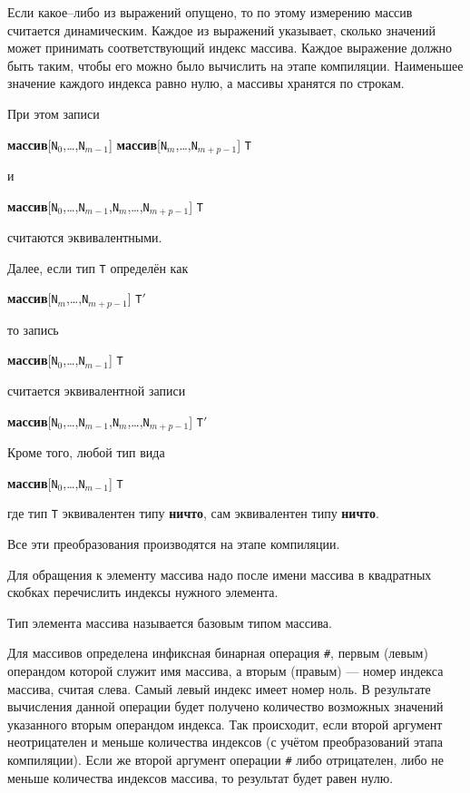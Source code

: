 \documentclass[10pt]{report}
\begin{document}
Если какое--либо из выражений опущено, то по этому измерению массив считается динамическим. Каждое из выражений указывает, сколько значений может принимать соответствующий
индекс массива. Каждое выражение должно быть таким, чтобы его можно было вычислить на этапе компиляции. Наименьшее значение каждого индекса равно нулю, а массивы хранятся по
строкам.

При этом записи
\begin{center}
\textbf{массив}[\texttt{N}$_0$,\dots,\texttt{N}$_{m-1}$] \textbf{массив}[\texttt{N}$_{m}$,\dots,\texttt{N}$_{m+p-1}$] \texttt{T}
\end{center}
и
\begin{center}
\textbf{массив}[\texttt{N}$_0$,\dots,\texttt{N}$_{m-1}$,\texttt{N}$_{m}$,\dots,\texttt{N}$_{m+p-1}$] \texttt{T}
\end{center}
считаются эквивалентными.

Далее, если тип \texttt{T} определён как
\begin{center}
\textbf{массив}[\texttt{N}$_{m}$,\dots,\texttt{N}$_{m+p-1}$] \texttt{T}$'$
\end{center}
то запись
\begin{center}
\textbf{массив}[\texttt{N}$_0$,\dots,\texttt{N}$_{m-1}$] \texttt{T}
\end{center}
считается эквивалентной записи
\begin{center}
\textbf{массив}[\texttt{N}$_0$,\dots,\texttt{N}$_{m-1}$,\texttt{N}$_{m}$,\dots,\texttt{N}$_{m+p-1}$] \texttt{T}$'$
\end{center}

Кроме того, любой тип вида
\begin{center}
\textbf{массив}[\texttt{N}$_0$,\dots,\texttt{N}$_{m-1}$] \texttt{T}
\end{center}
где тип \texttt{T} эквивалентен типу \textbf{ничто}, сам эквивалентен типу \textbf{ничто}.

Все эти преобразования производятся на этапе компиляции.

Для обращения к элементу массива надо после имени массива в квадратных скобках перечислить индексы нужного элемента.

Тип элемента массива называется базовым типом массива.

Для массивов определена инфиксная бинарная операция \texttt{\#}, первым (левым) операндом которой служит имя массива, а вторым (правым) --- номер индекса массива, считая слева.
Самый левый индекс имеет номер ноль. В результате вычисления данной операции будет получено количество возможных значений указанного вторым операндом индекса. Так происходит,
если второй аргумент неотрицателен и меньше количества индексов (с учётом преобразований этапа компиляции). Если же второй аргумент операции \texttt{\#} либо отрицателен, либо
не меньше количества индексов массива, то результат будет равен нулю.
\end{document}
